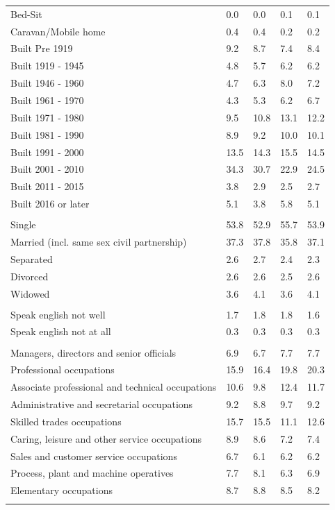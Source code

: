 \documentclass{article}
\begin{document}
\begin{table}[h]
\begin{tabular}{KTTTT}
Bed-Sit & 0.0& 0.0& 0.1& 0.1\\
Caravan/Mobile home & 0.4& 0.4& 0.2& 0.2\\
    \hline
Built Pre 1919 & 9.2& 8.7& 7.4& 8.4\\
Built 1919 - 1945 & 4.8& 5.7& 6.2& 6.2\\
Built  1946 - 1960 & 4.7& 6.3& 8.0& 7.2\\
Built  1961 - 1970 & 4.3& 5.3& 6.2& 6.7\\
Built  1971 - 1980 &  9.5& 10.8& 13.1& 12.2\\
Built  1981 - 1990 &  8.9&  9.2& 10.0& 10.1\\
Built  1991 - 2000 & 13.5& 14.3& 15.5& 14.5\\
Built  2001 - 2010 & 34.3& 30.7& 22.9& 24.5\\
Built  2011 - 2015 & 3.8& 2.9& 2.5& 2.7\\
Built  2016 or later & 5.1& 3.8& 5.8& 5.1\\
\hline
    \\
    \hline
Single & 53.8& 52.9& 55.7& 53.9\\
Married (incl. same sex civil partnership) & 37.3& 37.8& 35.8& 37.1\\
Separated  & 2.6& 2.7& 2.4& 2.3\\
Divorced  & 2.6& 2.6& 2.5& 2.6\\
Widowed & 3.6& 4.1& 3.6& 4.1\\
\hline
    \\ 
    \hline
Speak english not well & 1.7& 1.8& 1.8& 1.6\\
Speak english not at all & 0.3& 0.3& 0.3& 0.3\\
\hline
    \\
    \hline
Managers, directors and senior officials & 6.9& 6.7& 7.7& 7.7\\
Professional occupations & 15.9& 16.4& 19.8& 20.3\\
Associate professional and technical occupations & 10.6&  9.8& 12.4& 11.7\\
Administrative and secretarial occupations & 9.2& 8.8& 9.7& 9.2\\
Skilled trades occupations & 15.7& 15.5& 11.1& 12.6\\
Caring, leisure and other service occupations & 8.9& 8.6& 7.2& 7.4\\
Sales and customer service occupations & 6.7& 6.1& 6.2& 6.2\\
Process, plant and machine operatives & 7.7& 8.1& 6.3& 6.9\\
Elementary occupations & 8.7& 8.8& 8.5& 8.2\\
\hline
\end{tabular}
\end{table}
\end{document}
